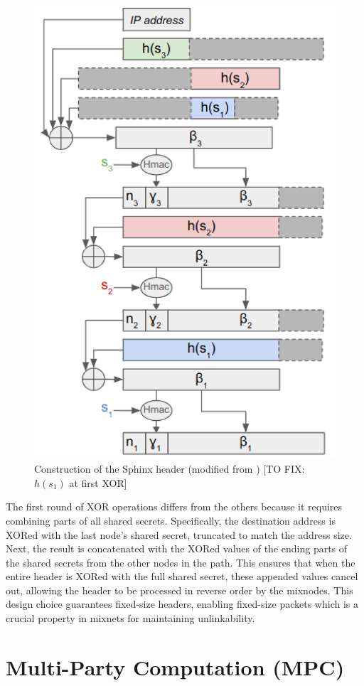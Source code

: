 \begin{figure}[H]
    \centering
    \includegraphics[width=0.5\linewidth]{Images/header_cipher.png}
    \caption{Construction of the Sphinx header (modified from \cite{sphinx}) [TO FIX: $h(s_1)$ at first XOR]}
    \label{fig:header_cipher}
\end{figure}

The first round of XOR operations differs from the others because it requires combining parts of all shared secrets. 
Specifically, the destination address is XORed with the last node’s shared secret, truncated to match the address size.
Next, the result is concatenated with the XORed values of the ending parts of the shared secrets from the other nodes in the path. 
This ensures that when the entire header is XORed with the full shared secret, these appended values cancel out, allowing the header to be processed in reverse order by the mixnodes.
This design choice guarantees fixed-size headers, enabling fixed-size packets which is a crucial property in mixnets for maintaining unlinkability.




\section{Multi-Party Computation (MPC)}

